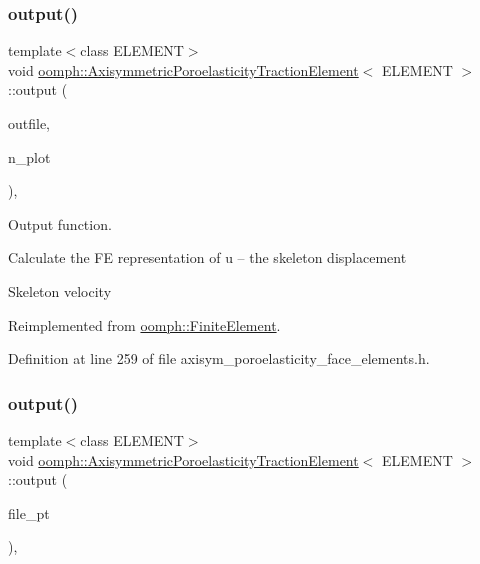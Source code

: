 \subsubsection{\texorpdfstring{output()}{output()}\hspace{0.1cm}{\footnotesize\ttfamily [2/4]}}
{\footnotesize\ttfamily template$<$class E\+L\+E\+M\+E\+NT$>$ \\
void \hyperlink{classoomph_1_1AxisymmetricPoroelasticityTractionElement}{oomph\+::\+Axisymmetric\+Poroelasticity\+Traction\+Element}$<$ E\+L\+E\+M\+E\+NT $>$\+::output (\begin{DoxyParamCaption}\item[{std\+::ostream \&}]{outfile,  }\item[{const unsigned \&}]{n\+\_\+plot }\end{DoxyParamCaption})\hspace{0.3cm}{\ttfamily [inline]}, {\ttfamily [virtual]}}



Output function. 

Calculate the FE representation of u -- the skeleton displacement

Skeleton velocity 

Reimplemented from \hyperlink{classoomph_1_1FiniteElement_afa9d9b2670f999b43e6679c9dd28c457}{oomph\+::\+Finite\+Element}.



Definition at line 259 of file axisym\+\_\+poroelasticity\+\_\+face\+\_\+elements.\+h.

\mbox{\label{classoomph_1_1AxisymmetricPoroelasticityTractionElement_a35244154ae620644ad434f7dc34173da}} 
\subsubsection{\texorpdfstring{output()}{output()}\hspace{0.1cm}{\footnotesize\ttfamily [3/4]}}
{\footnotesize\ttfamily template$<$class E\+L\+E\+M\+E\+NT$>$ \\
void \hyperlink{classoomph_1_1AxisymmetricPoroelasticityTractionElement}{oomph\+::\+Axisymmetric\+Poroelasticity\+Traction\+Element}$<$ E\+L\+E\+M\+E\+NT $>$\+::output (\begin{DoxyParamCaption}\item[{F\+I\+LE $\ast$}]{file\+\_\+pt }\end{DoxyParamCaption})\hspace{0.3cm}{\ttfamily [inline]}, {\ttfamily [virtual]}}



